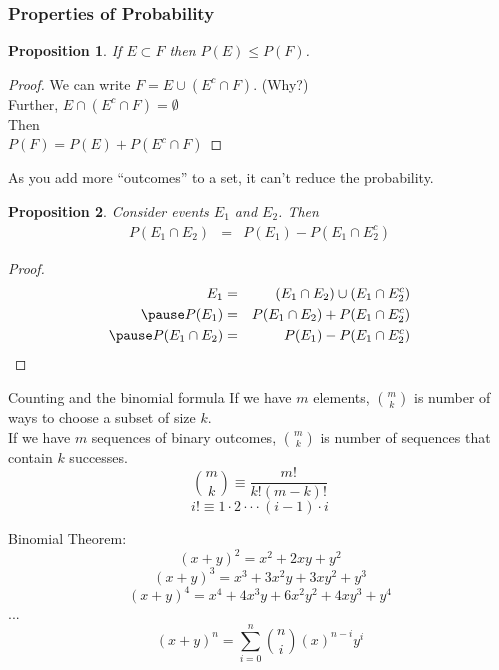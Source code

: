 \documentclass[handout]{beamer}
\newtheorem{prop}{Proposition}
\numberwithin{equation}{section}
\begin{document}
\begin{frame}
\frametitle{Properties of Probability} 
\pause 
\begin{prop} 
If $E \subset F$ then $P(E) \leq P(F)$.  
\end{prop} \pause 
\begin{proof}  \pause 
We can write $F = E \cup ( E^{c} \cap F)$. (Why?) \\ \pause 
Further, $E\cap(E^{c} \cap F )= \emptyset$ \\
\pause 
Then \\\pause 
$P(F) = P(E) + P(E^{c} \cap F) $ \pause 
\end{proof} 
As you add more ``outcomes''  to a set, it can't reduce the
probability.  
\end{frame}



\begin{frame}

\begin{prop}
Consider events $E_{1}$ and $E_{2}$.  Then 
\begin{eqnarray}
P(E_{1} \cap E_{2} ) & = & P(E_{1} ) - P(E_{1} \cap E_{2}^{c}) \nonumber 
\end{eqnarray}
\end{prop}

\pause 
\begin{proof}
\begin{eqnarray}
E_{1} & = & (E_{1} \cap E_{2}) \cup (E_{1} \cap E_{2}^{c}) \nonumber \\ \pause 
P(E_{1}) & = & P(E_{1} \cap E_{2} )  + P(E_{1} \cap E_{2}^{c} ) \nonumber \\ \pause 
P(E_{1} \cap E_{2} ) & = &  P(E_{1} ) - P(E_{1} \cap E_{2}^{c} ) \nonumber 
\end{eqnarray}




\end{proof}


\end{frame}


\begin{frame}{Counting and the binomial formula}
If we have $m$ elements, ${{m}\choose{k}}$ is number of ways to choose a subset of size $k$.\\
If we have $m$ sequences of binary outcomes, ${{m}\choose{k}}$ is number of sequences that contain $k$ successes.\\
$${{m}\choose{k}}\equiv\frac{m!}{k!(m-k)!}$$
$$i!\equiv1\cdot2\cdot\cdot\cdot(i-1)\cdot i$$

\pause
Binomial Theorem: 
$$(x+y)^2= x^2+2xy+y^2$$
$$(x+y)^3= x^3+3x^2y+3xy^2+y^3$$
$$(x+y)^4= x^4+4x^3y+6x^2y^2+4xy^3+y^4$$
$...$
$$(x+ y)^{n} = \sum_{i=0}^{n} {{n}\choose {i}} (x)^{n- i} y^{i} $$
\end{frame}
\end{document}
